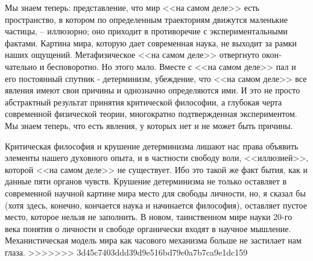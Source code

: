 \documentclass{book}
\begin{document}
Мы знаем теперь: представление, что мир <<на самом деле>> есть пространство, в котором по определенным траекториям движутся маленькие частицы, -- иллюзорно; оно приходит в противоречие с экспериментальными фактами. Картина мира, которую дает современная наука, не выходит за рамки наших ощущений. Метафизическое <<на самом деле>> отвергнуто окон­чательно и бесповоротно. Но этого мало. Вместе с <<на самом деле>> пал и его постоянный спутник - детерминизм, убежде­ние, что <<на самом деле>> все явления имеют свои причины и однозначно определяются ими. И это не просто абстрактный результат принятия критической философии, а глубокая черта современной физической теории, многократно подтвержденная экспериментом. Мы знаем теперь, что есть явления, у которых нет и не может быть причины.

Критическая философия и крушение детерминизма лишают нас права объявить элементы нашего духовного опыта, и в частности свободу воли, <<иллюзией>>, которой <<на самом деле>> не существует. Ибо это такой же факт бытия, как и данные пяти органов чувств. Крушение детерминизма не только оставляет в современной научной картине мира место для свободы личности, но, я сказал бы (хотя здесь, конечно, кончается наука и начинается философия), оставляет пустое  место, которое нельзя не заполнить.  В новом, таинственном мире науки 20-го века понятия о личности и свободе органически входят в науч­ное мышление. Механистическая модель мира как часового механизма больше не застилает нам глаза.
>>>>>>> 3d45c7403ddd39d9e516bd79e0a7b7ca9e1dc159
\end{document}
